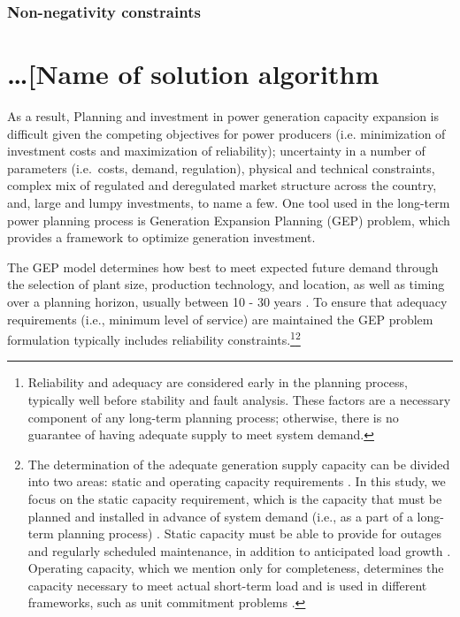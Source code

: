 \documentclass[10pt]{amsart}
\begin{document}
\subsubsection{Non-negativity constraints \nopunct}

\section{\ldots [Name of solution algorithm}


As a result, 
Planning and investment in power generation capacity expansion is difficult given the competing objectives for power producers (i.e. minimization of investment costs and maximization of reliability); uncertainty in a number of parameters (i.e.\ costs, demand, regulation), physical and technical constraints, complex mix of regulated and deregulated market structure across the country, and, large and lumpy investments, to name a few. 
One tool used in the long-term power planning process is Generation Expansion Planning (GEP) problem, which provides a framework to optimize generation investment.
	
The GEP model determines how best to meet expected future demand through the selection of plant size, production technology, and location, as well as timing over a planning horizon, usually between 10 - 30 years \parencite{hemmati:2013ab}. 
To ensure that adequacy requirements (i.e., minimum level of service) are maintained the GEP problem formulation typically includes reliability constraints.\footnote{Reliability and adequacy are considered early in the planning process, typically well before stability and fault analysis. These factors are a necessary component of any long-term planning process; otherwise, there is no guarantee of having adequate supply to meet system demand.}\footnote{The determination of the adequate generation supply capacity can be divided into two areas: static and operating capacity requirements \parencite{billinton1984reliability}.
In this study, we focus on the static capacity requirement, which is the capacity that must be planned and installed in advance of system demand (i.e., as a part of a long-term planning process) \parencite{billinton1984reliability}.
Static capacity must be able to provide for outages and regularly scheduled maintenance, in addition to anticipated load growth \parencite{billinton1984reliability}.
Operating capacity, which we mention only for completeness, determines the capacity necessary to meet actual short-term load and is used in different frameworks, such as unit commitment problems \parencite{billinton1984reliability}.}
	 
\end{document}
